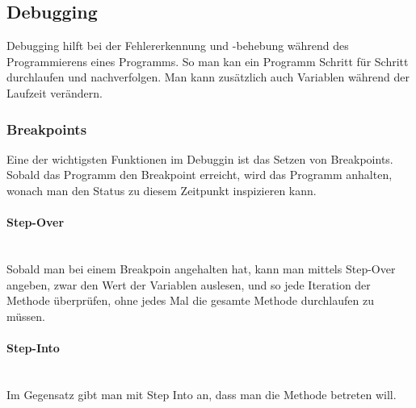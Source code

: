 \documentclass{article}
\newcommand{\paragraphlb}[1]{\paragraph{#1}\mbox{}\\}
\begin{document}
	\subsection{Debugging}
	Debugging hilft bei der Fehlererkennung und -behebung während des Programmierens eines Programms. So man kan ein Programm Schritt für Schritt durchlaufen und nachverfolgen. Man kann zusätzlich auch Variablen während der Laufzeit verändern. \\
	\subsubsection{Breakpoints}
	Eine der wichtigsten Funktionen im Debuggin ist das Setzen von Breakpoints. Sobald das Programm den Breakpoint erreicht, wird das Programm anhalten, wonach man den Status zu diesem Zeitpunkt inspizieren kann.
	\paragraphlb{Step-Over}
	Sobald man bei einem Breakpoin angehalten hat, kann man mittels Step-Over angeben, zwar den Wert der Variablen auslesen, und so jede Iteration der Methode überprüfen, ohne jedes Mal die gesamte Methode durchlaufen zu müssen.
	\paragraphlb{Step-Into}
	Im Gegensatz gibt man mit Step Into an, dass man die Methode betreten will.
\end{document}
